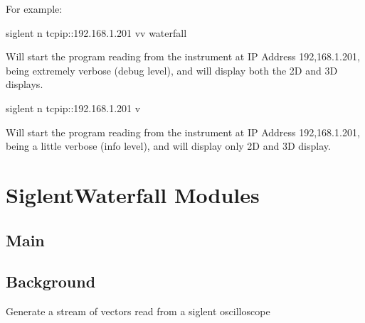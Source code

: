 \documentclass[letterpaper,10pt,english]{sphinxmanual}
\begin{document}
For example:

\begin{sphinxVerbatim}[commandchars=\\\{\}]
siglent \PYGZhy{}n tcpip::192.168.1.201 \PYGZhy{}vv \PYGZhy{}\PYGZhy{}waterfall
\end{sphinxVerbatim}

Will start the  program reading from the
instrument at IP Address 192,168.1.201, being extremely verbose (debug
level), and will display both the 2D and 3D displays.

\begin{sphinxVerbatim}[commandchars=\\\{\}]
siglent \PYGZhy{}n tcpip::192.168.1.201 \PYGZhy{}v
\end{sphinxVerbatim}

Will start the  program reading from the
instrument at IP Address 192,168.1.201, being a little verbose (info
level), and will display only 2D and 3D display.


\chapter{SiglentWaterfall  Modules}
\label{\detokenize{index:siglentwaterfall-modules}}

\section{Main}
\label{\detokenize{index:module-__main__}}\label{\detokenize{index:main}}

\section{Background}
\label{\detokenize{index:module-background}}\label{\detokenize{index:background}}
Generate a stream of vectors read from a siglent oscilloscope
\end{document}
